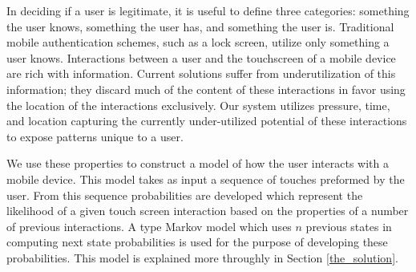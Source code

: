 In deciding if a user is legitimate,
it is useful to define three categories:
something the user knows,
something the user has, and
something the user is.
Traditional mobile authentication schemes,
such as a lock screen,
utilize only something a user knows.
Interactions between a user
and the touchscreen of a mobile device
are rich with information.
Current solutions suffer from underutilization 
of this information; 
they discard much of the content of these
interactions in favor using
the location of the interactions exclusively.
%
Our system utilizes 
pressure,
time, and
location 
capturing the currently under-utilized potential 
of these interactions to expose patterns unique to a user.

We use these properties to construct
a model of how the user interacts with a mobile device.
This model takes as input a sequence of touches preformed
by the user.
From this sequence
probabilities are developed
which represent the likelihood of a given touch screen interaction
based on the properties of a number of previous interactions.
A type Markov model which uses $n$ previous states
in computing next state probabilities
is used for the purpose of developing these probabilities.
This model is explained more throughly in
Section \ref{the_solution}. %





